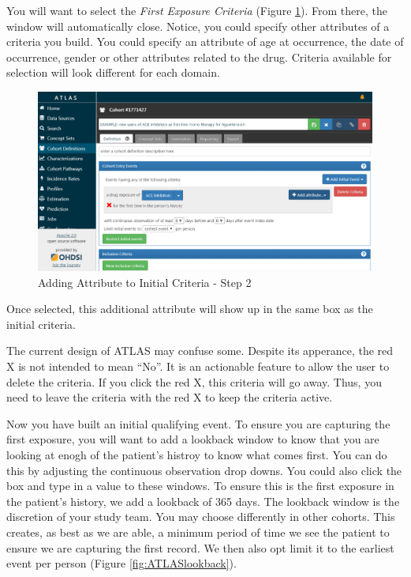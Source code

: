 \documentclass[11pt]{book}
\theoremstyle{definition}
\theoremstyle{definition}
\theoremstyle{definition}
\theoremstyle{remark}
\let\BeginKnitrBlock\begin \let\EndKnitrBlock\end
\begin{document}
You will want to select the \emph{First Exposure Criteria} (Figure \ref{fig:ATLASfirsttimeever}). From there, the window will automatically close. Notice, you could specify other attributes of a criteria you build. You could specify an attribute of age at occurrence, the date of occurrence, gender or other attributes related to the drug. Criteria available for selection will look different for each domain.

\begin{figure}

{\centering \includegraphics[width=0.9\linewidth]{images/Cohorts/ATLAS-firsttimeever} 

}

\caption{Adding Attribute to Initial Criteria - Step 2}\label{fig:ATLASfirsttimeever}
\end{figure}

Once selected, this additional attribute will show up in the same box as the initial criteria.
\BeginKnitrBlock{rmdimportant}
The current design of ATLAS may confuse some. Despite its apperance, the red X is not intended to mean ``No''. It is an actionable feature to allow the user to delete the criteria. If you click the red X, this criteria will go away. Thus, you need to leave the criteria with the red X to keep the criteria active.
\EndKnitrBlock{rmdimportant}

Now you have built an initial qualifying event. To ensure you are capturing the first exposure, you will want to add a lookback window to know that you are looking at enogh of the patient's histroy to know what comes first. You can do this by adjusting the continuous observation drop downs. You could also click the box and type in a value to these windows. To ensure this is the first exposure in the patient's history, we add a lookback of 365 days. The lookback window is the discretion of your study team. You may choose differently in other cohorts. This creates, as best as we are able, a minimum period of time we see the patient to ensure we are capturing the first record. We then also opt limit it to the earliest event per person (Figure \ref{fig:ATLASlookback}).
\end{document}

